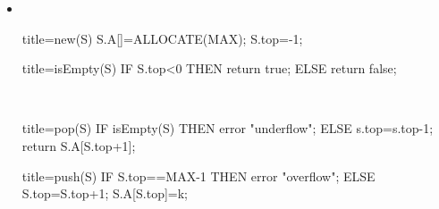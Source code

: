\documentclass[
    12pt,
    a4paper,
    ngerman,
    color=3b,%
    marginpar=false,
    colorback=false,
    leqno,
]{tudaexercise}
\begin{document}
\begin{itemize}
    \item {}\\
          \begin{minipage}[t]{.4\textwidth}
              \begin{ccode}[autogobble]{title=new(S)}
                  S.A[]=ALLOCATE(MAX);
                  S.top=-1;
              \end{ccode}
          \end{minipage}
          \begin{minipage}[t]{.4\textwidth}
              \begin{ccode}[autogobble]{title=isEmpty(S)}
                  IF S.top<0 THEN
                    return true;
                  ELSE
                    return false;
              \end{ccode}
          \end{minipage}
          \\
          \begin{minipage}[t]{.4\textwidth}
              \begin{ccode}[autogobble]{title=pop(S)}
                  IF isEmpty(S) THEN
                    error "underflow";
                  ELSE
                    s.top=s.top-1;
                    return S.A[S.top+1];
              \end{ccode}
          \end{minipage}
          \begin{minipage}[t]{.4\textwidth}
              \begin{ccode}[autogobble]{title=push(S)}
                  IF S.top==MAX-1 THEN
                    error "overflow";
                  ELSE
                    S.top=S.top+1;
                    S.A[S.top]=k;
              \end{ccode}
          \end{minipage}


\end{itemize}
\end{document}
